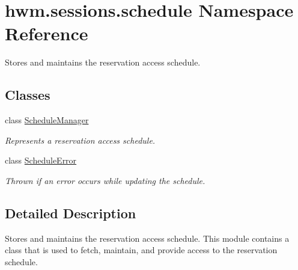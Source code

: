 \hypertarget{namespacehwm_1_1sessions_1_1schedule}{\section{hwm.\-sessions.\-schedule Namespace Reference}
\label{namespacehwm_1_1sessions_1_1schedule}
}


Stores and maintains the reservation access schedule.  


\subsection*{Classes}
\begin{DoxyCompactItemize}
\item 
class \hyperlink{classhwm_1_1sessions_1_1schedule_1_1_schedule_manager}{Schedule\-Manager}
\begin{DoxyCompactList}\small\item\em Represents a reservation access schedule. \end{DoxyCompactList}\item 
class \hyperlink{classhwm_1_1sessions_1_1schedule_1_1_schedule_error}{Schedule\-Error}
\begin{DoxyCompactList}\small\item\em Thrown if an error occurs while updating the schedule. \end{DoxyCompactList}\end{DoxyCompactItemize}


\subsection{Detailed Description}
Stores and maintains the reservation access schedule. This module contains a class that is used to fetch, maintain, and provide access to the reservation schedule. 